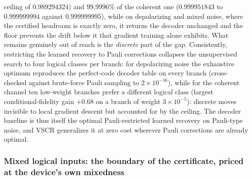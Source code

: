 \documentclass[aps,prxquantum,reprint,superscriptaddress]{revtex4-2}
\begin{document}
ceiling of $0.989294324$) and $99.9996\%$ of the coherent one ($0.999951843$ to
$0.999999994$ against $0.999999995$), while on depolarizing and mixed noise,
where the certified headroom is exactly zero, it returns the decoder unchanged
and the floor prevents the drift below it that gradient training alone exhibits.
What remains genuinely out of reach is the \emph{discrete} part of the gap.
Consistently, restricting the learned recovery to Pauli
corrections collapses the unsupervised search to four logical classes per
branch: for depolarizing noise the exhaustive optimum reproduces the
perfect-code decoder table on every branch (cross-checked against
brute-force Pauli sampling to $2\times10^{-16}$), while for the coherent
channel ten low-weight branches prefer a different logical class (largest
conditional-fidelity gain $+0.68$ on a branch of weight $3\times10^{-5}$):
discrete moves invisible to local gradient descent but accounted for by the
ceiling. The decoder baseline is thus itself the optimal Pauli-restricted
learned recovery on Pauli-type noise, and VSCR generalizes it at zero cost
wherever Pauli corrections are already optimal.

\subsubsection*{Mixed logical inputs: the boundary of the certificate, priced at
the device's own mixedness}
\end{document}
